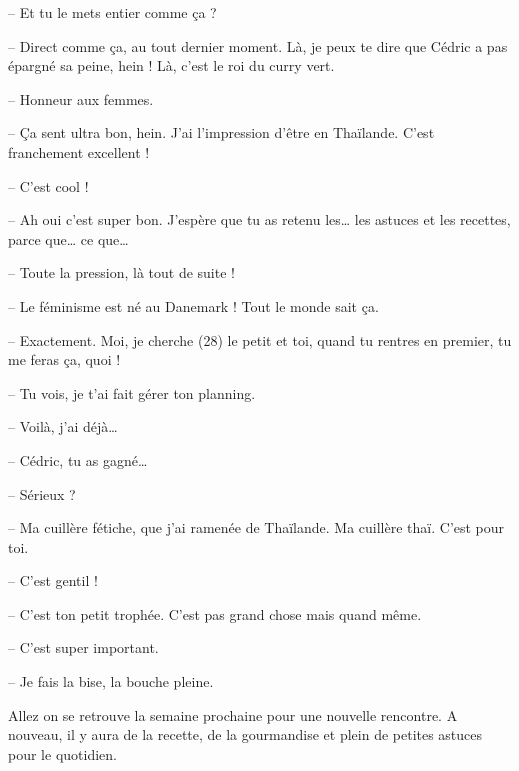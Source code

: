 \documentclass[11pt, french]{report}
\begin{document}
-- Et tu le mets entier comme ça ?

-- Direct comme ça, au tout dernier moment. Là, je peux te dire que Cédric a pas
épargné sa peine, hein ! Là, c’est le roi du curry vert.

-- Honneur aux femmes.

-- Ça sent ultra bon, hein. J’ai l’impression d’être en Thaïlande. C’est
franchement excellent !

-- C’est cool !

-- Ah oui c’est super bon. J’espère que tu as retenu les… les astuces et les
recettes, parce que… ce que…

-- Toute la pression, là tout de suite !

-- Le féminisme est né au Danemark ! Tout le monde sait ça.

-- Exactement. Moi, je cherche (28) le petit et toi, quand tu rentres en premier,
tu me feras ça, quoi !

-- Tu vois, je t’ai fait gérer ton planning.

-- Voilà, j’ai déjà…

-- Cédric, tu as gagné…

-- Sérieux ?

-- Ma cuillère fétiche, que j’ai ramenée de Thaïlande. Ma cuillère thaï. C’est
pour toi.

-- C’est gentil !

-- C’est ton petit trophée. C’est pas grand chose mais quand même.

-- C’est super important.

-- Je fais la bise, la bouche pleine.

Allez on se retrouve la semaine prochaine pour une nouvelle rencontre. A nouveau,
il y aura de la recette, de la gourmandise et plein de petites astuces pour le
quotidien.

\vfill
\end{document}
